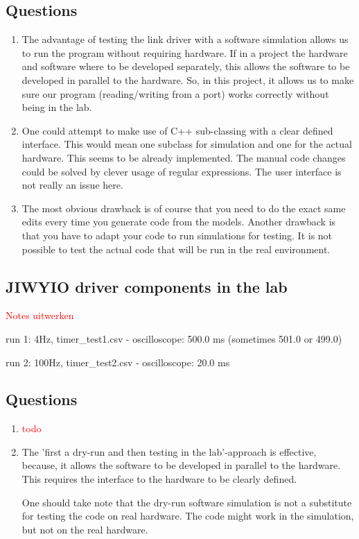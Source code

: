 \documentclass[a4paper,twoside,11pt]{article}
\newcommand{\todo}[1]{{\Large\sc\textcolor{red}{#1}}}
\begin{document}
\subsection{Questions}
\begin{enumerate}
	\item The advantage of testing the link driver with a software simulation 
		allows us to run the program without requiring hardware.
		If in a project the hardware and software where to be developed 
		separately, this allows the software to be developed in parallel to the hardware.
		So, in this project, it allows us to make sure our program (reading/writing from a port) works correctly without being in the lab.
	\item One could attempt to make use of C++ sub-classing with a clear defined interface.
		This would mean one subclass for simulation and one for the actual hardware.
		This seems to be already implemented. The manual code changes could be solved by clever usage of regular expressions. The user interface is not really an issue here.
	\item The most obvious drawback is of course that you need to do the exact same edits every time you generate code from the models. Another drawback is that you have to adapt your code to run simulations for testing. It is not possible to test the actual code that will be run in the real environment.
\end{enumerate}

\subsection{JIWYIO driver components in the lab}
\todo{Notes uitwerken}

run 1: 4Hz, timer_test1.csv - oscilloscope: 500.0 ms (sometimes 501.0 or 499.0)

run 2: 100Hz, timer_test2.csv - oscilloscope: 20.0 ms

\subsection{Questions}
\begin{enumerate}
 \item \todo{todo}
 \item The 'first a dry-run and then testing in the lab'-approach is effective, because, it allows the software to be developed in parallel to the hardware.
	 This requires the interface to the hardware to be clearly defined.
	 \smallskip

	 One should take note that the dry-run software simulation is not a 
	 substitute for testing the code on real hardware.
	 The code might work in the simulation, but not on the real hardware.
\end{enumerate}
\end{document}
